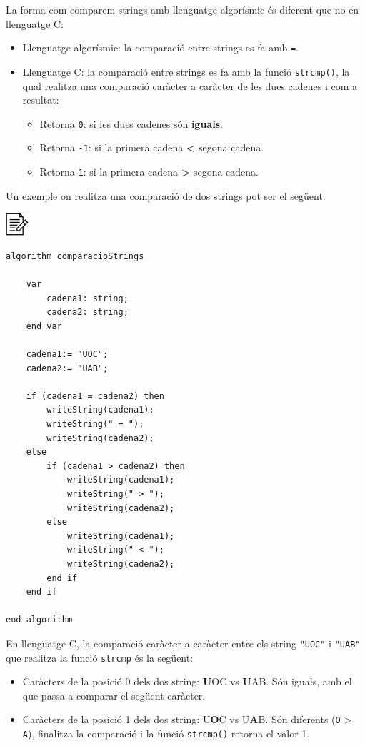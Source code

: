 \documentclass[
]{book}
\providecommand{\tightlist}{%
  \setlength{\itemsep}{0pt}\setlength{\parskip}{0pt}}
\begin{document}
La forma com comparem strings amb llenguatge algorísmic és diferent que no en llenguatge C:

\begin{itemize}
\tightlist
\item
  Llenguatge algorísmic: la comparació entre strings es fa amb \texttt{=}.
\item
  Llenguatge C: la comparació entre strings es fa amb la funció \texttt{strcmp()}, la qual realitza una comparació caràcter a caràcter de les dues cadenes i com a resultat:

  \begin{itemize}
  \tightlist
  \item
    Retorna \texttt{0}: si les dues cadenes són \textbf{iguals}.
  \item
    Retorna \texttt{-1}: si la primera cadena \textbf{\textless{}} segona cadena.
  \item
    Retorna \texttt{1}: si la primera cadena \textbf{\textgreater{}} segona cadena.
  \end{itemize}
\end{itemize}

Un exemple on realitza una comparació de dos strings pot ser el següent:

\includegraphics{./img/alg.png}

\begin{verbatim}
algorithm comparacioStrings

    var
        cadena1: string;
        cadena2: string;
    end var

    cadena1:= "UOC";
    cadena2:= "UAB";

    if (cadena1 = cadena2) then
        writeString(cadena1);
        writeString(" = ");
        writeString(cadena2);
    else
        if (cadena1 > cadena2) then
            writeString(cadena1);
            writeString(" > ");
            writeString(cadena2);
        else
            writeString(cadena1);
            writeString(" < ");
            writeString(cadena2);
        end if
    end if

end algorithm
\end{verbatim}

En llenguatge C, la comparació caràcter a caràcter entre els string \texttt{"UOC"} i \texttt{"UAB"} que realitza la funció \texttt{strcmp} és la següent:

\begin{itemize}
\tightlist
\item
  Caràcters de la posició 0 dels dos string: \textbf{U}OC vs \textbf{U}AB. Són iguals, amb el que passa a comparar el següent caràcter.
\item
  Caràcters de la posició 1 dels dos string: U\textbf{O}C vs U\textbf{A}B. Són diferents (\texttt{\textquotesingle{}O\textquotesingle{}} \textgreater{} \texttt{\textquotesingle{}A\textquotesingle{}}), finalitza la comparació i la funció \texttt{strcmp()} retorna el valor 1.
\end{itemize}
\end{document}
